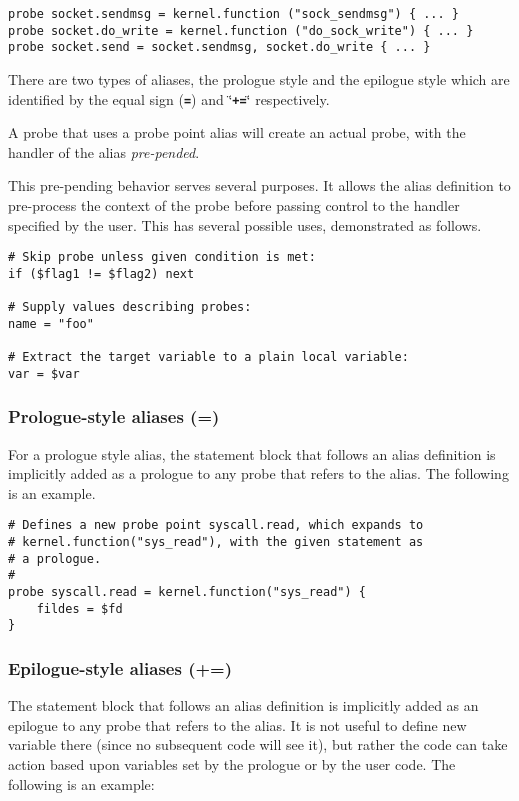 \documentclass[twoside,english]{article}
\newenvironment{vindent}
{\begin{list}{}{\setlength{\listparindent}{6pt}}
\item[]}
{\end{list}}
\begin{document}
\begin{vindent}
\begin{verbatim}
probe socket.sendmsg = kernel.function ("sock_sendmsg") { ... }
probe socket.do_write = kernel.function ("do_sock_write") { ... }
probe socket.send = socket.sendmsg, socket.do_write { ... }
\end{verbatim}
\end{vindent}

There are two types of aliases, the prologue style and the epilogue style
which are identified by the equal sign (\texttt{\textbf{=}}) and \char`\"{}\texttt{\textbf{+=}}\char`\"{}
respectively.

A probe that uses a probe point alias will create an actual probe, with
the handler of the alias \emph{pre-pended}.

This pre-pending behavior serves several purposes. It allows the alias definition
to pre-process the context of the probe before passing control to the handler
specified by the user. This has several possible uses, demonstrated as follows.

\begin{vindent}
\begin{verbatim}
# Skip probe unless given condition is met:
if ($flag1 != $flag2) next

# Supply values describing probes:
name = "foo"

# Extract the target variable to a plain local variable:
var = $var
\end{verbatim}
\end{vindent}

\subsubsection{Prologue-style aliases (=)}
\index{=}
For a prologue style alias, the statement block that follows an alias definition
is implicitly added as a prologue to any probe that refers to the alias.
The following is an example.

\begin{vindent}
\begin{verbatim}
# Defines a new probe point syscall.read, which expands to
# kernel.function("sys_read"), with the given statement as
# a prologue.
#
probe syscall.read = kernel.function("sys_read") {
    fildes = $fd
}
\end{verbatim}
\end{vindent}

\subsubsection{Epilogue-style aliases (+=)}
\index{+=}
The statement block that follows an alias definition is implicitly added
as an epilogue to any probe that refers to the alias.  It is not useful
to define new variable there (since no subsequent code will see it), but
rather the code can take action based upon variables set by the
prologue or by the user code.  The following is an example:
\end{document}
